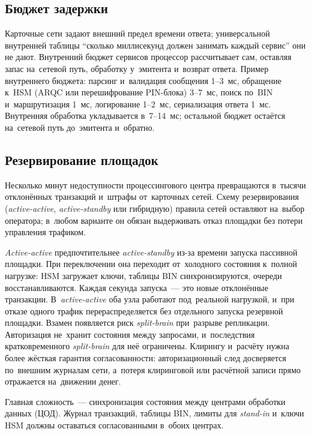 \subsection*{Бюджет задержки}

Карточные сети задают внешний предел времени ответа; универсальной внутренней
таблицы \enquote{сколько миллисекунд должен занимать каждый сервис} они не дают.
Внутренний бюджет сервисов процессор рассчитывает сам, оставляя запас
на~сетевой путь, обработку у~эмитента и~возврат ответа. Пример внутреннего бюджета: парсинг
и~валидация сообщения 1--3~мс, обращение к~HSM (ARQC или
перешифрование PIN-блока) 3--7~мс, поиск по~BIN и~маршрутизация 1~мс, логирование 1--2~мс,
сериализация ответа 1~мс. Внутренняя обработка укладывается в~7--14~мс;
остальной бюджет остаётся на~сетевой путь до~эмитента и~обратно.

\subsection*{Резервирование площадок}

Несколько минут недоступности процессингового центра превращаются в~тысячи
отклонённых транзакций и~штрафы от~карточных сетей. Схему резервирования
(\textit{active-active}, \textit{active-standby} или гибридную) правила сетей
оставляют на~выбор оператора; в~любом варианте он обязан выдерживать отказ
площадки без потери управления трафиком.

\textit{Active-active} предпочтительнее \textit{active-standby} из-за времени
запуска пассивной площадки. При переключении она переходит от~холодного
состояния к~полной нагрузке: HSM загружает ключи, таблицы BIN синхронизируются,
очереди восстанавливаются. Каждая секунда запуска~--- это новые отклонённые
транзакции. В~\textit{active-active} оба узла работают под~реальной нагрузкой,
и~при отказе одного трафик перераспределяется без отдельного запуска резервной
площадки. Взамен появляется риск \textit{split-brain} при~разрыве репликации.
Авторизация не~хранит состояния между запросами, и~последствия кратковременного
\textit{split-brain} для неё ограничены. Клирингу и~расчёту нужна более жёсткая гарантия согласованности:
авторизационный след досверяется по~внешним журналам сети, а~потеря клиринговой
или расчётной записи прямо отражается на~движении денег.

Главная сложность~--- синхронизация состояния между центрами обработки данных
(ЦОД). Журнал транзакций, таблицы BIN, лимиты для \textit{stand-in} и~ключи HSM
должны оставаться согласованными в~обоих центрах.

